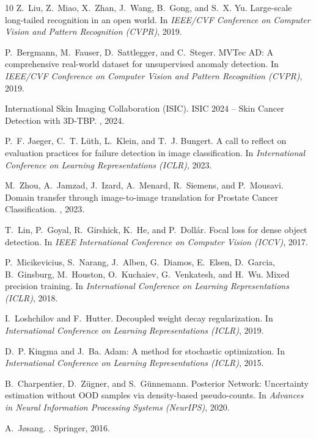 \documentclass[letterpaper]{article} %
\begin{document}
\begin{thebibliography}{10}
Z.~Liu, Z.~Miao, X.~Zhan, J.~Wang, B.~Gong, and S.~X. Yu.
\newblock Large-scale long-tailed recognition in an open world.
\newblock In {\em IEEE/CVF Conference on Computer Vision and Pattern Recognition (CVPR)}, 2019.

P.~Bergmann, M.~Fauser, D.~Sattlegger, and C.~Steger.
\newblock MVTec AD: A comprehensive real-world dataset for unsupervised anomaly detection.
\newblock In {\em IEEE/CVF Conference on Computer Vision and Pattern Recognition (CVPR)}, 2019.

International Skin Imaging Collaboration (ISIC).
\newblock ISIC 2024 -- Skin Cancer Detection with 3D-TBP.
, 2024.

P.~F. Jaeger, C.~T. L{\"u}th, L.~Klein, and T.~J. Bungert.
\newblock A call to reflect on evaluation practices for failure detection in image classification.
\newblock In {\em International Conference on Learning Representations (ICLR)}, 2023.

M.~Zhou, A.~Jamzad, J.~Izard, A.~Menard, R.~Siemens, and P.~Mousavi.
\newblock Domain transfer through image-to-image translation for Prostate Cancer Classification.
, 2023.

T.~Lin, P.~Goyal, R.~Girshick, K.~He, and P.~Doll{\'a}r.
\newblock Focal loss for dense object detection.
\newblock In {\em IEEE International Conference on Computer Vision (ICCV)}, 2017.

P.~Micikevicius, S.~Narang, J.~Alben, G.~Diamos, E.~Elsen, D.~Garcia, B.~Ginsburg, M.~Houston, O.~Kuchaiev, G.~Venkatesh, and H.~Wu.
\newblock Mixed precision training.
\newblock In {\em International Conference on Learning Representations (ICLR)}, 2018.

I.~Loshchilov and F.~Hutter.
\newblock Decoupled weight decay regularization.
\newblock In {\em International Conference on Learning Representations (ICLR)}, 2019.

D.~P. Kingma and J.~Ba.
\newblock Adam: A method for stochastic optimization.
\newblock In {\em International Conference on Learning Representations (ICLR)}, 2015.

B.~Charpentier, D.~Z{\"u}gner, and S.~G{\"u}nnemann.
\newblock Posterior Network: Uncertainty estimation without OOD samples via density-based pseudo-counts.
\newblock In {\em Advances in Neural Information Processing Systems (NeurIPS)}, 2020.

A.~J{\o}sang.
.
\newblock Springer, 2016.

\end{thebibliography}
\end{document}
